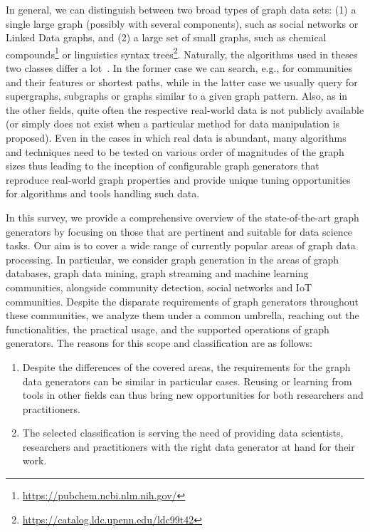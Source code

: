 In general, we can distinguish between two broad types of graph data sets: (1) a single large graph (possibly with several components), such as social networks  or Linked Data graphs, and (2) a large set of small graphs, such as chemical compounds\footnote{\url{https://pubchem.ncbi.nlm.nih.gov/}} or linguistics syntax trees\footnote{\url{https://catalog.ldc.upenn.edu/ldc99t42}}. Naturally, the algorithms used in theses two classes differ a lot~\cite{DBLP:books/igi/Sakr2011}. In the former case we can search, e.g., for communities and their features or shortest paths, while in the latter case we usually query for supergraphs, subgraphs or graphs similar to a given graph pattern. Also, as in the other fields, quite often the respective real-world data is not publicly available (or simply does not exist when a particular method for data manipulation is proposed). 
Even in the cases in which real data is abundant, many algorithms and techniques need to be tested on various order of magnitudes of the graph sizes thus leading to the inception of 
configurable graph generators that reproduce real-world graph properties and provide unique tuning opportunities for 
algorithms and tools handling such data. 

In this survey, we provide a comprehensive overview of the state-of-the-art graph generators by focusing on those that are pertinent and suitable for data science tasks. Our aim is to cover a wide range of currently popular areas of graph data processing. In particular, we consider graph generation in the areas of graph databases, graph data mining, graph streaming and machine learning communities, alongside community detection, social networks and IoT communities. Despite the disparate requirements of graph generators throughout these communities, we analyze them under a common umbrella, reaching out the functionalities, the practical usage, and the supported operations of graph generators. The reasons for this scope and classification are as follows:

\begin{enumerate}
  \item Despite the differences of the covered areas, the requirements for the graph data generators can be similar in particular cases. Reusing or learning from tools in other fields can thus bring new opportunities for both researchers and practitioners. 
  \item The selected classification is serving the need of providing data scientists, researchers and practitioners with the right data generator at hand for their work.
\end{enumerate}

